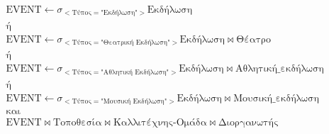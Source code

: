 \begin{equation}
  \begin{split}
    &\text{EVENT} \leftarrow \sigma_{<\text{Τύπος} =
      \text{"Εκδήλωση"}>}\text{Εκδήλωση} \\
    &\text{ή}\\
    &\text{EVENT} \leftarrow \sigma_{<\text{Τύπος} = \text{"Θεατρική
        Εκδήλωση"}>}\text{Εκδήλωση} \bowtie \text{Θέατρο} \\
    &\text{ή} \\
    &\text{EVENT} \leftarrow \sigma_{<\text{Τύπος} = \text{"Αθλητική
        Εκδήλωση"}>}\text{Εκδήλωση} \bowtie \text{Αθλητική\_εκδήλωση} \\
    &\text{ή} \\
    &\text{EVENT} \leftarrow \sigma_{<\text{Τύπος} = \text{"Μουσική
        Εκδήλωση"}>}\text{Εκδήλωση} \bowtie \text{Μουσική\_εκδήλωση} \\
    &\text{και} \\
    &\text{EVENT} \bowtie \text{Τοποθεσία} \bowtie
    \text{Καλλιτέχνης-Ομάδα} \bowtie \text{Διοργανωτής} \\
  \end{split}
\end{equation}

  




  

      

